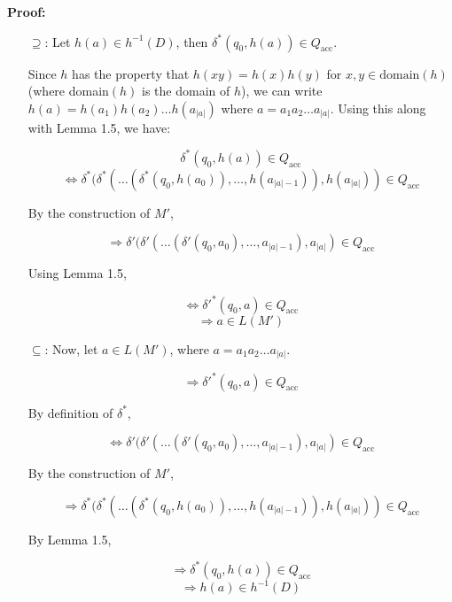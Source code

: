 \textbf{Proof:}
\begin{itemize}
    \item[$\supseteq$:] Let \( h(a) \in h^{-1}(D) \), then \( \delta^*(q_0, h(a)) \in Q_{\text{acc}} \).
    
    Since \( h \) has the property that \( h(xy) = h(x) h(y) \) for \( x, y \in \text{domain}(h) \) (where domain\( (h) \) is the domain of \( h \)), we can write \( h(a) = h(a_1) h(a_2) \dots h(a_{|a|}) \) where \( a = a_1 a_2 \dots a_{|a|} \). Using this along with Lemma 1.5, we have:
    
    \[
    \delta^*(q_0, h(a)) \in Q_{\text{acc}}
    \]
    \[
    \Leftrightarrow \delta^*(\delta^*(\dots(\delta^*(q_0, h(a_0)), \dots, h(a_{|a|-1})), h(a_{|a|})) \in Q_{\text{acc}}
    \]
    
    By the construction of \( M' \),
    
    \[
    \Rightarrow \delta'(\delta'(\dots(\delta'(q_0, a_0), \dots, a_{|a|-1}), a_{|a|}) \in Q_{\text{acc}}
    \]
    
    Using Lemma 1.5,
    
    \[
    \Leftrightarrow \delta'^*(q_0, a) \in Q_{\text{acc}}
    \]
    \[
    \Rightarrow a \in L(M')
    \]

    \item[$\subseteq$:] Now, let \( a \in L(M') \), where \( a = a_1 a_2 \dots a_{|a|} \).
    
    \[
    \Rightarrow \delta'^*(q_0, a) \in Q_{\text{acc}}
    \]

    By definition of \( \delta^* \),

    \[
    \Leftrightarrow \delta'(\delta'(\dots(\delta'(q_0, a_0), \dots, a_{|a|-1}), a_{|a|}) \in Q_{\text{acc}}
    \]

    By the construction of \( M' \),

    \[
    \Rightarrow \delta^*(\delta^*(\dots(\delta^*(q_0, h(a_0)), \dots, h(a_{|a|-1})), h(a_{|a|})) \in Q_{\text{acc}}
    \]

    By Lemma 1.5,

    \[
    \Rightarrow \delta^*(q_0, h(a)) \in Q_{\text{acc}}
    \]
    \[
    \Rightarrow h(a) \in h^{-1}(D)
    \]

    \qedsymbol
\end{itemize}




